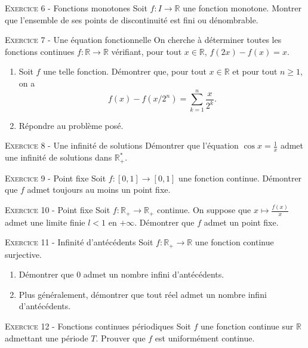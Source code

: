 \documentclass[11pt]{article}
\newcommand{\mtr}{\mathbb{R}}
\begin{document}


\vskip0.3cm\noindent\textsc{Exercice 6} - Fonctions monotones
\vskip0.2cm
Soit $f:I\to\mathbb R$ une fonction monotone. Montrer que l'ensemble de ses points de discontinuité est fini ou dénombrable.




\vskip0.3cm\noindent\textsc{Exercice 7} - Une équation fonctionnelle
\vskip0.2cm
On cherche à déterminer toutes les fonctions continues $f:\mathbb R\to\mathbb R$  vérifiant, pour tout $x\in\mathbb R$, $f(2x)-f(x)=x.$
\begin{enumerate}
\item Soit $f$ une telle fonction. Démontrer que, pour tout $x\in\mathbb R$ et pour tout $n\geq 1$, on a 
$$f(x)-f(x/2^n)=\sum_{k=1}^n\frac{x}{2^k}.$$
\item Répondre au problème posé.
\end{enumerate}




\vskip0.3cm\noindent\textsc{Exercice 8} - Une infinité de solutions
\vskip0.2cm
Démontrer que l'équation $\cos x=\frac 1x$ admet une infinité de solutions dans $\mathbb R_+^*$.




\vskip0.3cm\noindent\textsc{Exercice 9} - Point fixe
\vskip0.2cm
Soit $f:[0,1]\to[0,1]$ une fonction continue. Démontrer que $f$ admet toujours au moins un point fixe.




\vskip0.3cm\noindent\textsc{Exercice 10} - Point fixe
\vskip0.2cm
Soit $f:\mathbb R_+\to \mathbb R_+$ continue. On suppose que $x\mapsto \frac{f(x)}x$ admet une limite
finie $l<1$ en $+\infty$. Démontrer que $f$ admet un point fixe.




\vskip0.3cm\noindent\textsc{Exercice 11} - Infinité d'antécédents
\vskip0.2cm
Soit $f:\mathbb R_+\to\mathbb R$ une fonction continue surjective. 
\begin{enumerate}
\item Démontrer que $0$ admet un nombre infini d'antécédents.
\item Plus généralement, démontrer que tout réel admet un nombre infini d'antécédents.
\end{enumerate}




\vskip0.3cm\noindent\textsc{Exercice 12} - Fonctions continues périodiques
\vskip0.2cm
Soit $f$ une fonction continue sur $\mtr$ admettant une période $T$. Prouver que $f$ est uniformément continue.
\end{document}

